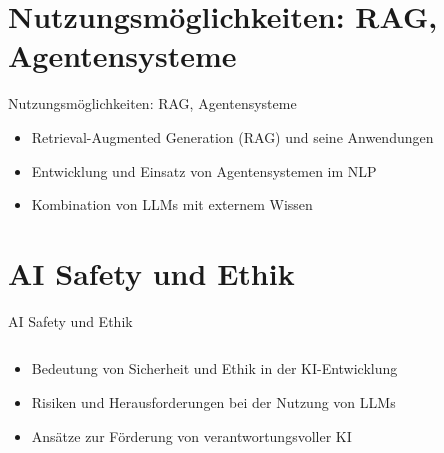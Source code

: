 \documentclass[aspectratio=1610, xcolor=dvipsnames, 9pt]{beamer}
\begin{document}
\section{Nutzungsmöglichkeiten: RAG, Agentensysteme}

\begin{frame}{Nutzungsmöglichkeiten: RAG, Agentensysteme}
  \begin{itemize}
    \item Retrieval-Augmented Generation (RAG) und seine Anwendungen
    \item Entwicklung und Einsatz von Agentensystemen im NLP
    \item Kombination von LLMs mit externem Wissen
  \end{itemize}
\end{frame}


\section{AI Safety und Ethik}
\begin{frame}{AI Safety und Ethik}
  \begin{columns}
    \begin{column}{1\textwidth}
      \begin{itemize}
        \item Bedeutung von Sicherheit und Ethik in der KI-Entwicklung
        \item Risiken und Herausforderungen bei der Nutzung von LLMs
        \item Ansätze zur Förderung von verantwortungsvoller KI
      \end{itemize}
    \end{column}
  \end{columns}
\end{frame}
\end{document}
